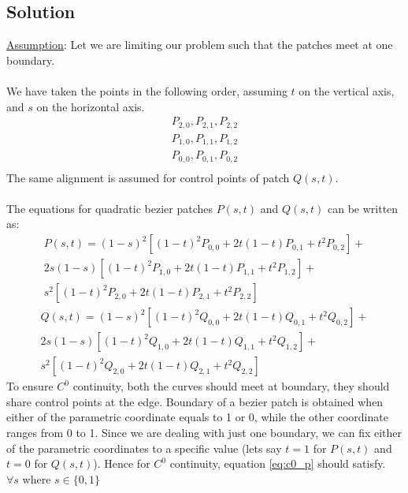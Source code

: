 \documentclass[a4paper, 11pt]{article}
\begin{document}
\begin{enumerate}
\begin{enumerate}[label=\alph*.]
    \subsection*{Solution}
    \underline{Assumption}: Let we are limiting our problem such that the patches meet at one boundary. \\ \\
    We have taken the points in the following order, assuming $t$ on the vertical axis, and $s$ on the horizontal axis. 
    \begin{align*}
        P_{2,0} , P_{2,1},  P_{2,2} \\ 
        P_{1,0} , P_{1,1},  P_{1,2} \\ 
        P_{0,0} , P_{0,1},  P_{0,2} \\
    \end{align*}
    The same alignment is assumed for control points of patch \(Q(s,t)\). \\ \\
    The equations for quadratic bezier patches \(P(s,t)\) and \(Q(s,t)\) can be written as:
    \begin{multline}
    \label{eq:p(s,t)}
        P(s,t) = (1-s)^2[(1-t)^2 P_{0,0} + 2t(1-t) P_{0,1} + t^2 P_{0,2}] + \\ 2s(1-s)[(1-t)^2 P_{1,0} + 2t(1-t) P_{1,1} + t^2 P_{1,2}] + \\
        s^2[(1-t)^2 P_{2,0} + 2t(1-t) P_{2,1} + t^2 P_{2,2}]
    \end{multline}
    \begin{multline}
    \label{eq:q(s,t)}
        Q(s,t) = (1-s)^2[(1-t)^2 Q_{0,0} + 2t(1-t) Q_{0,1} + t^2 Q_{0,2}] + \\ 2s(1-s)[(1-t)^2 Q_{1,0} + 2t(1-t) Q_{1,1} + t^2 Q_{1,2}] + \\
        s^2[(1-t)^2 Q_{2,0} + 2t(1-t) Q_{2,1} + t^2 Q_{2,2}]
    \end{multline}
    To ensure \(C^0\) continuity,  both the curves should meet at boundary, they should share control points at the edge. Boundary of a bezier patch is obtained when either of the parametric coordinate equals to 1 or 0, while the other coordinate ranges from 0 to 1. Since we are dealing with just one boundary, we can fix either of the parametric coordinates to a specific value (lets say $t=1$ for $P(s,t)$ and $t=0$ for $Q(s,t)$). Hence for \(C^0\) continuity, equation \ref{eq:c0_p} should satisfy.\\ $\forall s$ where $s \in \{0,1\}$
    \begin{equation}
        \label{eq:c0_p}

\end{equation}
\end{enumerate}
\end{enumerate}
\end{document}
